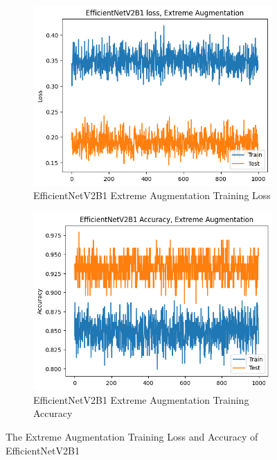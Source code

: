 \documentclass[]{final_report}
\begin{document}
\begin{figure}[ht!]
  \centering
  \begin{subfigure}{0.4\textwidth}
    \includegraphics[width=\linewidth]{images/EfficientNetV2B1-Extreme-Augmentation-Loss.png}
    \caption{EfficientNetV2B1 Extreme Augmentation Training Loss}
    \label{fig:EfficientNetV2B1-extreme-augmentation-training-loss}
  \end{subfigure}
  \begin{subfigure}{0.4\textwidth}
    \includegraphics[width=\linewidth]{images/EfficientNetV2B1-Extreme-Augmentation-Accuracy.png}
    \caption{EfficientNetV2B1 Extreme Augmentation Training Accuracy}
    \label{fig:EfficientNetV2B1-extreme-augmentation-training-accuracy}
  \end{subfigure}
  \caption{The Extreme Augmentation Training Loss and Accuracy of EfficientNetV2B1}
  \label{fig:EfficientNetV2B1-extreme-augmentation-training}
\end{figure}
\end{document}
